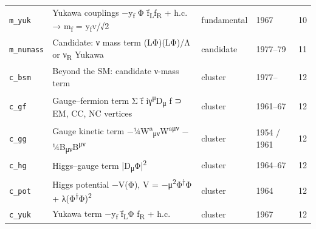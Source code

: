 \begin{longtable}{@{}l>{\raggedright\arraybackslash}p{7.6cm}lll@{}}
\texttt{m\_yuk} & Yukawa couplings −y\textsubscript{f} Φ f̄\textsubscript{L}f\textsubscript{R} + h.c. → m\textsubscript{f} = y\textsubscript{f}v/√2 & fundamental & 1967 & 10\\
\texttt{m\_numass} & Candidate: ν mass term (LΦ)(LΦ)/Λ or ν\textsubscript{R} Yukawa & candidate & 1977–79 & 11\\
\texttt{c\_bsm} & Beyond the SM: candidate ν-mass term & cluster & 1977– & 12\\
\texttt{c\_gf} & Gauge–fermion term Σ f̄ iγ\textsuperscript{μ}D\textsubscript{μ} f ⊃ EM, CC, NC vertices & cluster & 1961–67 & 12\\
\texttt{c\_gg} & Gauge kinetic term −¼W\textsuperscript{a}\textsubscript{μν}W\textsuperscript{aμν} − ¼B\textsubscript{μν}B\textsuperscript{μν} & cluster & 1954 / 1961 & 12\\
\texttt{c\_hg} & Higgs–gauge term |D\textsubscript{μ}Φ|\textsuperscript{2} & cluster & 1964–67 & 12\\
\texttt{c\_pot} & Higgs potential −V(Φ), V = −μ\textsuperscript{2}Φ\textsuperscript{†}Φ + λ(Φ\textsuperscript{†}Φ)\textsuperscript{2} & cluster & 1964 & 12\\
\texttt{c\_yuk} & Yukawa term −y\textsubscript{f} f̄\textsubscript{L}Φ f\textsubscript{R} + h.c. & cluster & 1967 & 12\\
\end{longtable}
